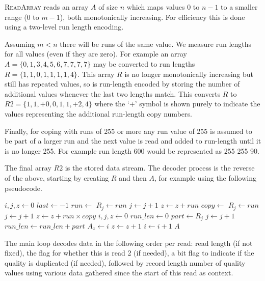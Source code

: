 \documentclass[a4paper]{article}
\begin{document}
\textsc{ReadArray} reads an array $A$ of size $n$ which maps values 0
to $n-1$ to a smaller range (0 to $m-1$), both monotonically
increasing.  For efficiency this is done using a two-level run length
encoding.

Assuming $m < n$ there will be runs of the same value.  We measure run
lengths for all values (even if they are zero).  For example an array
$A = \{0,1,3,4,5,6,7,7,7,7\}$ may be converted to run lengths $R =
\{1,1,0,1,1,1,1,4\}$.  This array $R$ is no longer monotonically
increasing but still has repeated values, so is run-length encoded by
storing the number of additional values whenever the last two lengths
match.  This converts $R$ to $R2 = \{1, 1, +0, 0, 1, 1, +2, 4\}$ where
the `+' symbol is shown purely to indicate the values representing the
additional run-length copy numbers.

Finally, for coping with runs of 255 or more any run value of 255 is
assumed to be part of a larger run and the next value is read and
added to run-length until it is no longer 255.  For example run length
600 would be represented as 255 255 90.

The final array $R2$ is the stored data stream.  The decoder process
is the reverse of the above, starting by creating $R$ and then $A$,
for example using the following pseudocode.

\begin{algorithmic}[1]
\State $i,j,z \gets 0$
\State $last \gets -1$
 
  \State $run \gets $ 
  \State $R_j \gets run$
  \State $j \gets j+1$
  \State $z \gets z + run$
    \State $copy \gets $ 
      \State $R_j \gets run$
      \State $j \gets j+1$
    \EndFor
    \State $z \gets z + run \times copy$
  \EndIf
\EndWhile
\Statex
\State $i,j,z \gets 0$
 
  \State $run\_len \gets 0$
  \Repeat
    \State $part \gets R_j$
    \State $j \gets j + 1$
    \State $run\_len \gets run\_len + part$
    \State $A_z \gets i$
    \State $z \gets z+1$
  \EndFor
  \State $i \gets i+1$
\EndWhile
\Statex
\State \Return $A$
\EndFunction
\end{algorithmic}

The main loop decodes data in the following order per read:  read
length (if not fixed), the flag for whether this is read 2 (if
needed), a bit flag to indicate if the quality is duplicated (if
needed), followed by record length number of quality values using
various data gathered since the start of this read as context.
\end{document}
